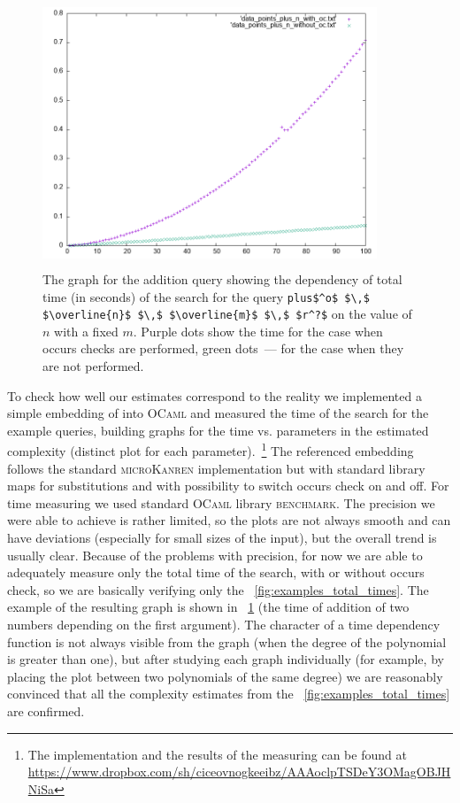 \begin{figure}[t]
    \includegraphics[width=10cm,height=8cm]{plot_example}
  \caption{The graph for the addition query showing the dependency of total time (in seconds) of the search for the query \lstinline|plus$^o$ $\,$ $\overline{n}$ $\,$ $\overline{m}$ $\,$ $r^?$| on the value of $n$ with a fixed $m$. Purple dots show the time for the case when occurs checks are performed, green dots~--- for the case when they are not performed. }
  \label{fig:plot_example}
\end{figure}

To check how well our estimates correspond to the reality we implemented a simple embedding of \mK into \textsc{OCaml} and measured the time of the search for the example queries,
building graphs for the time vs. parameters in the estimated complexity (distinct plot for each parameter).~\footnote{The implementation and the results of the measuring can be found at \url{https://www.dropbox.com/sh/ciceovnogkeeibz/AAAoclpTSDeY3OMagOBJHNiSa}} The referenced embedding follows the standard \textsc{microKanren} implementation but with standard library maps for substitutions and with possibility to switch occurs check on and off.
For time measuring we used standard \textsc{OCaml} library \textsc{benchmark}. The precision we were able to achieve is rather limited, so the plots are not always smooth and can have
deviations (especially for small sizes of the input), but the overall trend is usually clear. Because of the problems with precision, for now we are able to adequately measure only the total
time of the search, with or without occurs check, so we are basically verifying only the \figureword~\ref{fig:examples_total_times}. 
The example of the resulting graph is shown in \figureword~\ref{fig:plot_example} (the time of addition of two numbers depending on the first argument). The character of a time dependency function
is not always visible from the graph (when the degree of the polynomial is greater than one), but after studying each graph individually (for example, by placing the plot between two polynomials of the same degree) we are reasonably convinced that all the complexity estimates from the \figureword~\ref{fig:examples_total_times} are confirmed.
